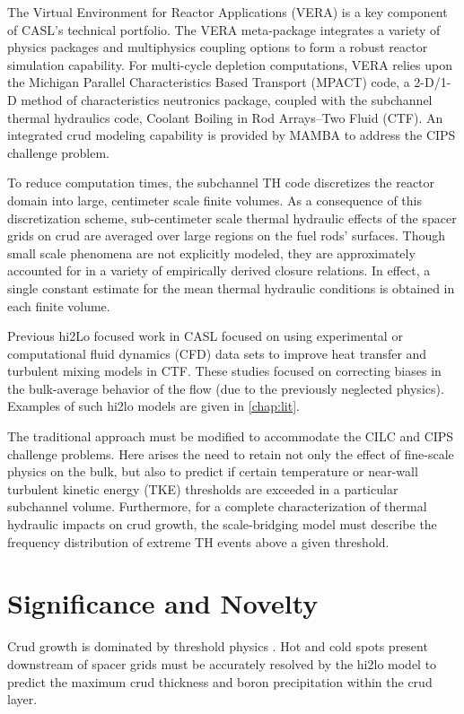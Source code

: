 The Virtual Environment for Reactor Applications (VERA) is a key component of
CASL's technical portfolio.  The VERA meta-package integrates a variety of physics
packages and multiphysics coupling options to form a robust reactor simulation
capability.  For multi-cycle depletion computations, VERA relies upon the Michigan Parallel Characteristics Based Transport (MPACT) code, a
2-D/1-D method of characteristics neutronics package, coupled with the subchannel
thermal hydraulics code, Coolant Boiling in Rod Arrays–Two Fluid (CTF).
An integrated crud modeling capability
is provided by MAMBA to address the CIPS challenge problem.

To reduce computation times, the subchannel TH code discretizes the reactor
domain into large, centimeter scale finite volumes. As a consequence of this
discretization scheme, sub-centimeter scale thermal hydraulic effects of the
spacer grids on crud are averaged over large regions on the fuel rods'
surfaces.  Though small scale phenomena are not explicitly modeled, they are
approximately accounted for in a variety of empirically derived closure
relations.  In effect, a single constant estimate for the mean thermal
hydraulic conditions is obtained in each finite volume.
 

Previous hi2Lo focused work in CASL focused on using experimental or computational fluid dynamics (CFD) data sets to improve heat transfer and turbulent mixing models in CTF.  These studies focused on
correcting biases in the bulk-average behavior of the flow (due to the
previously neglected physics).  Examples of such hi2lo models are given in
\autoref{chap:lit}.

The traditional approach must be modified to accommodate the CILC and CIPS
challenge problems.  Here arises the need to retain not only the effect of
fine-scale physics on the bulk, but also to predict if certain temperature or
near-wall turbulent kinetic energy (TKE) thresholds are exceeded in a particular subchannel volume.  Furthermore, for a
complete characterization of thermal hydraulic impacts on crud growth, the
scale-bridging model must describe the frequency distribution of
extreme TH events above a given threshold.


\section{Significance and Novelty}

Crud growth is dominated by threshold physics \cite{mongoose17}.  Hot and cold spots
present downstream of spacer grids must be accurately resolved by the hi2lo model to predict the maximum crud
thickness and boron precipitation within the crud layer.

